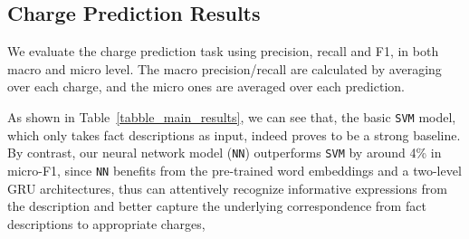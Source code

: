 \subsection{Charge Prediction Results}
\label{sec_main_results}
We evaluate the charge prediction task using precision, recall and F1, in both macro and micro level. 
The macro precision/recall are calculated by averaging over %
each charge, and the micro ones are averaged  over each prediction. %



As shown in Table~\ref{tabble_main_results}, we can see that, the basic \texttt{SVM} model, 
which only takes fact descriptions as input, indeed proves to be a strong baseline. 
By contrast, our  neural network model (\texttt{NN}) outperforms \texttt{SVM} 
by around 4\% in micro-F1, since \texttt{NN} benefits from  the pre-trained word embeddings and 
a two-level GRU architectures, thus can attentively recognize informative expressions from the description and
 better capture the underlying correspondence from fact descriptions to appropriate charges, 
%



